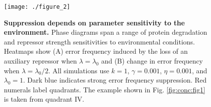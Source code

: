 \begin{figure}[h!]
\centering
\texttt{[image: ./figure\_2]}
\caption[Suppression depends on parameter sensitivity to the environment.]{\textbf{Suppression depends on parameter sensitivity to the environment.} Phase diagrams span a range of protein degradation and repressor strength sensitivities to environmental conditions. Heatmaps show (A) error frequency induced by the loss of an auxiliary repressor when $\lambda = \lambda_0$ and (B) change in error frequency when $\lambda = \lambda_0 / 2$. All simulations use $k = 1$, $\gamma = 0.001$, $\eta = 0.001$, and $\lambda_0 = 1$. Dark blue indicates strong error frequency suppression. Red numerals label quadrants. The example shown in Fig. \ref{fig:conc:fig1} is taken from quadrant IV. }
\label{fig:conc:fig2}
\end{figure} 


